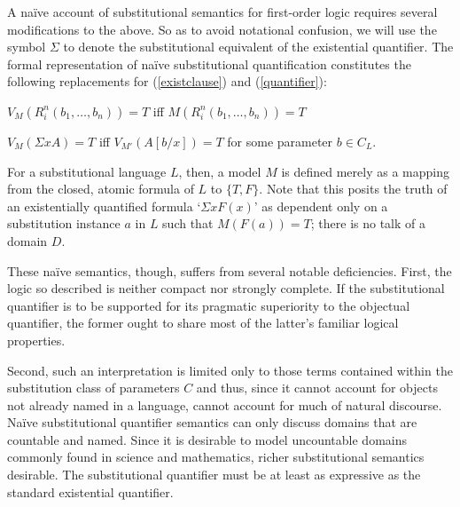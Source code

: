 A na\"ive account of substitutional semantics for first-order logic
requires several modifications to the above. So as to avoid notational
confusion, we will use the symbol $\Sigma$ to denote the
substitutional equivalent of the existential quantifier.  The formal
representation of na\"ive substitutional quantification constitutes the
following replacements for (\ref{existclause}) and (\ref{quantifier}):

\begin{te} 
$V_M(R^n_i(b_1,\ldots ,b_n)) = T$ iff $M(R^n_i(b_1,\ldots ,b_n)) = T$
\end{te}

\begin{te}
$V_M(\Sigma xA) = T$ iff $V_{M'}(A[b/x]) = T$ for some parameter $b
\in C_L$.\\
\end{te} 
For a substitutional language $L$, then, a model $M$ is defined
merely as a mapping from the closed, atomic formula of $L$ to
$\{T,F\}$.  Note that this posits the truth of an existentially
quantified formula `$\Sigma xF(x)$' as dependent only on a substitution
instance $a$ in $L$ such that $M(F(a)) = T$; there is no talk of a
domain $D$.

These na\"ive semantics, though, suffers from several notable
deficiencies.  First, the logic so described is neither compact nor
strongly complete.
  If the substitutional quantifier is to be
supported for its pragmatic superiority to the objectual quantifier,
the former ought to share most of the latter's familiar logical
properties.

Second, such an interpretation is limited only to those terms
contained within the substitution class of parameters $C$ and thus,
since it cannot account for objects not already named in a language,
cannot account for much of natural discourse.  Na\"ive substitutional
quantifier semantics can only discuss domains that are countable and
named. 
Since it is desirable to model uncountable domains commonly found in
science and mathematics, richer substitutional semantics desirable.
 The substitutional
quantifier must be at least as expressive as the standard existential
quantifier.

